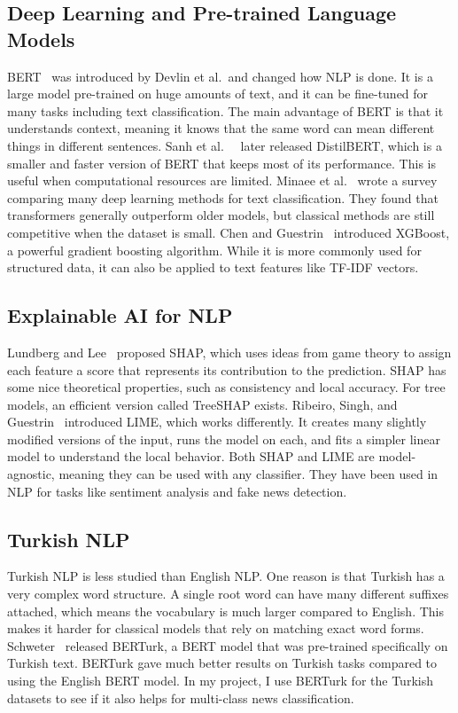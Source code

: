 \documentclass[conference]{IEEEtran}
\begin{document}
\subsection{Deep Learning and Pre-trained Language Models}

BERT~\cite{b2} was introduced by Devlin et al.\ and changed how NLP is done. It is a large
model pre-trained on huge amounts of text, and it can be fine-tuned for many tasks including
text classification. The main advantage of BERT is that it understands context, meaning it
knows that the same word can mean different things in different sentences. Sanh et al.\
~\cite{b3} later released DistilBERT, which is a smaller and faster version of BERT that
keeps most of its performance. This is useful when computational resources are limited.
Minaee et al.~\cite{b10} wrote a survey comparing many deep learning methods for text
classification. They found that transformers generally outperform older models, but classical
methods are still competitive when the dataset is small. Chen and Guestrin~\cite{b6}
introduced XGBoost, a powerful gradient boosting algorithm. While it is more commonly used
for structured data, it can also be applied to text features like TF-IDF vectors.

\subsection{Explainable AI for NLP}

Lundberg and Lee~\cite{b4} proposed SHAP, which uses ideas from game theory to assign each
feature a score that represents its contribution to the prediction. SHAP has some nice
theoretical properties, such as consistency and local accuracy. For tree models, an efficient
version called TreeSHAP exists. Ribeiro, Singh, and Guestrin~\cite{b5} introduced LIME, which
works differently. It creates many slightly modified versions of the input, runs the model on
each, and fits a simpler linear model to understand the local behavior. Both SHAP and LIME
are model-agnostic, meaning they can be used with any classifier. They have been used in NLP
for tasks like sentiment analysis and fake news detection.

\subsection{Turkish NLP}

Turkish NLP is less studied than English NLP. One reason is that Turkish has a very complex
word structure. A single root word can have many different suffixes attached, which means
the vocabulary is much larger compared to English. This makes it harder for classical models
that rely on matching exact word forms. Schweter~\cite{b7} released BERTurk, a BERT model
that was pre-trained specifically on Turkish text. BERTurk gave much better results on
Turkish tasks compared to using the English BERT model. In my project, I use BERTurk for
the Turkish datasets to see if it also helps for multi-class news classification.
\end{document}
